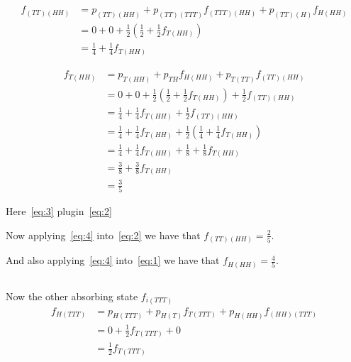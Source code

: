 \documentclass[12pt, a4paper]{article}
\begin{document}
\begin{subequations}
  \begin{align}
    f_{(TT)(HH)} &= p_{(TT)(HH)} + p_{(TT)(TTT)}f_{(TTT)(HH)} + p_{(TT)(H)} f_{H(HH)}\\
                 &= 0 + 0 + \frac{1}{2} (\frac{1}{2} + \frac{1}{2} f_{T(HH)})\\
                 &= \frac{1}{4} + \frac{1}{4} f_{T(HH)} \label{eq:2}
  \end{align}
\end{subequations}

\begin{subequations}
  \begin{align}
    f_{T(HH)} &= p_{T(HH)} + p_{TH}f_{H(HH)} + p_{T(TT)} f_{(TT)(HH)}\\
              &= 0 + 0 + \frac{1}{2} (\frac{1}{2} + \frac{1}{2} f_{T(HH)}) + \frac{1}{2} f_{(TT)(HH)}\\
              &= \frac{1}{4} + \frac{1}{4} f_{T(HH)} + \frac{1}{2} f_{(TT)(HH)}\\
              &= \frac{1}{4} + \frac{1}{4} f_{T(HH)} + \frac{1}{2} (\frac{1}{4} + \frac{1}{4} f_{T(HH)})\label{eq:3}\\
              &= \frac{1}{4} + \frac{1}{4} f_{T(HH)} + \frac{1}{8} + \frac{1}{8} f_{T(HH)}\\
              &= \frac{3}{8} + \frac{3}{8} f_{T(HH)}\\
              &= \frac{3}{5}\label{eq:4}
  \end{align}
\end{subequations}


Here~\ref{eq:3} plugin~\ref{eq:2}

Now applying~\ref{eq:4} into~\ref{eq:2} we have that $f_{(TT)(HH)} = \frac{2}{5}$.

And also applying~\ref{eq:4} into~\ref{eq:1} we have that $f_{H(HH)} = \frac{4}{5}$.

\subsection{}
Now the other absorbing state $f_{i(TTT)}$
\begin{subequations}
  \begin{align}
    f_{H(TTT)} &= p_{H(TTT)} + p_{H(T)} f_{T(TTT)} + p_{H(HH)}f_{(HH)(TTT)}\\
               &= 0 + \frac{1}{2} f_{T(TTT)} + 0\\
               &= \frac{1}{2} f_{T(TTT)}\label{eq:5}
  \end{align}
\end{subequations}
\end{document}

